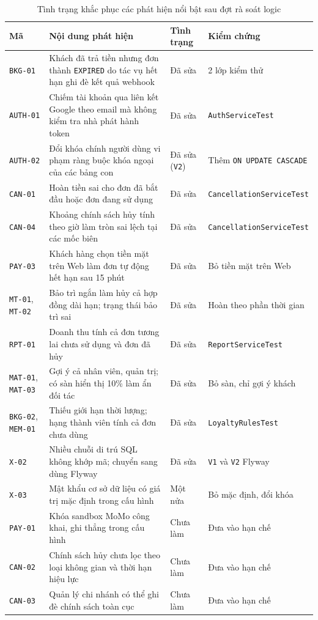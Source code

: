 \begin{table}[H]
\centering
\caption{Tình trạng khắc phục các phát hiện nổi bật sau đợt rà soát logic}
\label{tab:kt_audit_khacphuc}
\footnotesize
\renewcommand{\arraystretch}{1.2}
\begin{tabular}{|p{1.9cm}|p{6.6cm}|p{2.0cm}|p{3.3cm}|}
\hline
\textbf{Mã} & \textbf{Nội dung phát hiện} & \textbf{Tình trạng} & \textbf{Kiểm chứng} \\
\hline
\texttt{BKG-01} & Khách đã trả tiền nhưng đơn thành \texttt{EXPIRED} do tác vụ hết hạn ghi đè kết quả webhook & Đã sửa & 2 lớp kiểm thử \\
\hline
\texttt{AUTH-01} & Chiếm tài khoản qua liên kết Google theo email mà không kiểm tra nhà phát hành token & Đã sửa & \texttt{AuthServiceTest} \\
\hline
\texttt{AUTH-02} & Đổi khóa chính người dùng vi phạm ràng buộc khóa ngoại của các bảng con & Đã sửa (\texttt{V2}) & Thêm \texttt{ON UPDATE CASCADE} \\
\hline
\texttt{CAN-01} & Hoàn tiền sai cho đơn đã bắt đầu hoặc đơn đang sử dụng & Đã sửa & \texttt{Cancellation\allowbreak ServiceTest} \\
\hline
\texttt{CAN-04} & Khoảng chính sách hủy tính theo giờ làm tròn sai lệch tại các mốc biên & Đã sửa & \texttt{Cancellation\allowbreak ServiceTest} \\
\hline
\texttt{PAY-03} & Khách hàng chọn tiền mặt trên Web làm đơn tự động hết hạn sau 15 phút & Đã sửa & Bỏ tiền mặt trên Web \\
\hline
\texttt{MT-01}, \texttt{MT-02} & Bảo trì ngắn làm hủy cả hợp đồng dài hạn; trạng thái bảo trì sai & Đã sửa & Hoàn theo phần thời gian \\
\hline
\texttt{RPT-01} & Doanh thu tính cả đơn tương lai chưa sử dụng và đơn đã hủy & Đã sửa & \texttt{ReportService\allowbreak Test} \\
\hline
\texttt{MAT-01}, \texttt{MAT-03} & Gợi ý cả nhân viên, quản trị; có sàn hiển thị 10\% làm ẩn đối tác & Đã sửa & Bỏ sàn, chỉ gợi ý khách \\
\hline
\texttt{BKG-02}, \texttt{MEM-01} & Thiếu giới hạn thời lượng; hạng thành viên tính cả đơn chưa dùng & Đã sửa & \texttt{Loyalty\allowbreak RulesTest} \\
\hline
\texttt{X-02} & Nhiều chuỗi di trú SQL không khớp mã; chuyển sang dùng Flyway & Đã sửa & \texttt{V1} và \texttt{V2} Flyway \\
\hline
\texttt{X-03} & Mật khẩu cơ sở dữ liệu có giá trị mặc định trong cấu hình & Một nửa & Bỏ mặc định, đổi khóa \\
\hline
\texttt{PAY-01} & Khóa sandbox MoMo công khai, ghi thẳng trong cấu hình & Chưa làm & Đưa vào hạn chế \\
\hline
\texttt{CAN-02} & Chính sách hủy chưa lọc theo loại không gian và thời hạn hiệu lực & Chưa làm & Đưa vào hạn chế \\
\hline
\texttt{CAN-03} & Quản lý chi nhánh có thể ghi đè chính sách toàn cục & Chưa làm & Đưa vào hạn chế \\
\hline
\end{tabular}
\end{table}

